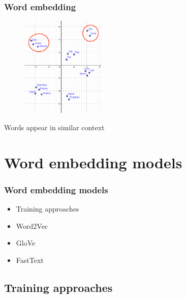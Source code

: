 

\begin{frame}
	\frametitle{Word embedding}

	\begin{figure}
		\includegraphics[width=4cm]{./figures/Group_context}
	\end{figure}
		\begin{center}
		{Words appear in similar context}
		\end{center}
	\vspace{-0.5cm}

\end{frame}


\section{Word embedding models}


\begin{frame}
\frametitle{Word embedding models}

	\begin{itemize}
		\item Training approaches
		\item Word2Vec
		\item GloVe
		\item FastText
	\end{itemize}

\end{frame}

\subsection{Training approaches}

